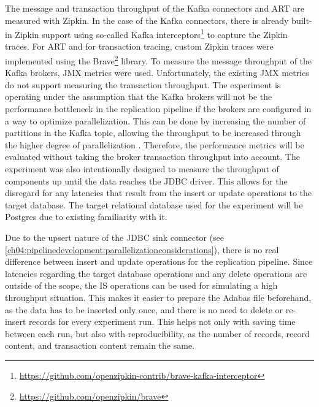 The message and transaction throughput of the Kafka connectors and \ac{ART} are measured with Zipkin. In the case of the Kafka connectors, there is already built-in Zipkin support using so-called Kafka interceptors\footnote{\url{https://github.com/openzipkin-contrib/brave-kafka-interceptor}} to capture the Zipkin traces. For \ac{ART} and for transaction tracing, custom Zipkin traces were implemented using the Brave\footnote{\url{https://github.com/openzipkin/brave}} library. To measure the message throughput of the Kafka brokers, \ac{JMX} metrics were used. Unfortunately, the existing \ac{JMX} metrics do not support measuring the transaction throughput. The experiment is operating under the assumption that the Kafka brokers will not be the performance bottleneck in the replication pipeline if the brokers are configured in a way to optimize parallelization. This can be done by increasing the number of partitions in the Kafka topic, allowing the throughput to be increased through the higher degree of parallelization \cite{cerezo2021analysisparallelism}. Therefore, the performance metrics will be evaluated without taking the broker transaction throughput into account.
The experiment was also intentionally designed to measure the throughput of components up until the data reaches the \ac{JDBC} driver. This allows for the disregard for any latencies that result from the insert or update operations to the target database. The target relational database used for the experiment will be Postgres due to existing familiarity with it.

Due to the upsert nature of the \ac{JDBC} sink connector (see \ref{ch04:pipelinedevelopment:parallelizationconsiderations}), there is no real difference between insert and update operations for the replication pipeline. Since latencies regarding the target database operations and any delete operations are outside of the scope, the \ac{IS} operations can be used for simulating a high throughput situation. This makes it easier to prepare the Adabas file beforehand, as the data has to be inserted only once, and there is no need to delete or re-insert records for every experiment run. This helps not only with saving time between each run, but also with reproducibility, as the number of records, record content, and transaction content remain the same.

